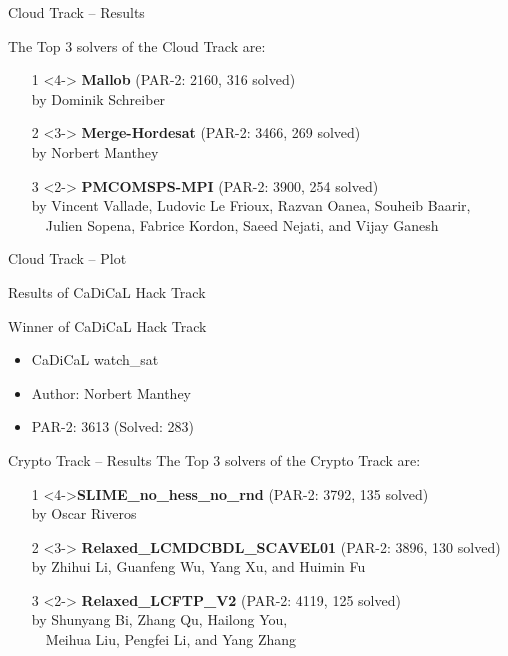 \documentclass[trans]{beamer}
\begin{document}

\begin{frame}{Cloud Track -- Results}

The Top 3 solvers of the Cloud Track are:
\begin{itemize}

\item[1]<4-> {\bf Mallob} (PAR-2: 2160, 316 solved)\\
by Dominik Schreiber
\item[2]<3-> {\bf Merge-Hordesat} (PAR-2: 3466, 269 solved)\\
by Norbert Manthey
\item[3]<2-> {\bf PMCOMSPS-MPI} (PAR-2: 3900, 254 solved)\\
by Vincent Vallade, Ludovic Le Frioux, Razvan Oanea, Souheib Baarir, \\~~Julien Sopena, Fabrice Kordon, Saeed Nejati, and Vijay Ganesh
\end{itemize}
\end{frame}


\begin{frame}{Cloud Track -- Plot}
\centering
\resizebox{.9\textwidth}{!}{%

}
\end{frame}


\begin{frame}{Results of CaDiCaL Hack Track}
\begin{block}{Winner of CaDiCaL Hack Track}
\begin{itemize}
\item<2> CaDiCaL watch\_sat 
\item<2> Author: Norbert Manthey
\item<2> PAR-2: 3613 (Solved: 283)
\end{itemize}
\end{block}
\end{frame}


\begin{frame}{Crypto Track -- Results}
The Top 3 solvers of the Crypto Track are:
\begin{itemize}
\item[1]<4->{\bf SLIME\_no\_hess\_no\_rnd} (PAR-2: 3792, 135 solved)\\
by Oscar Riveros
\item[2]<3-> {\bf Relaxed\_LCMDCBDL\_SCAVEL01} (PAR-2: 3896, 130 solved)\\
by Zhihui Li, Guanfeng Wu, Yang Xu, and Huimin Fu
\item[3]<2-> {\bf Relaxed\_LCFTP\_V2} (PAR-2: 4119, 125 solved)\\
by Shunyang Bi, Zhang Qu, Hailong You, \\~~Meihua Liu, Pengfei Li, and Yang Zhang
\end{itemize}

\end{frame}
\end{document}
